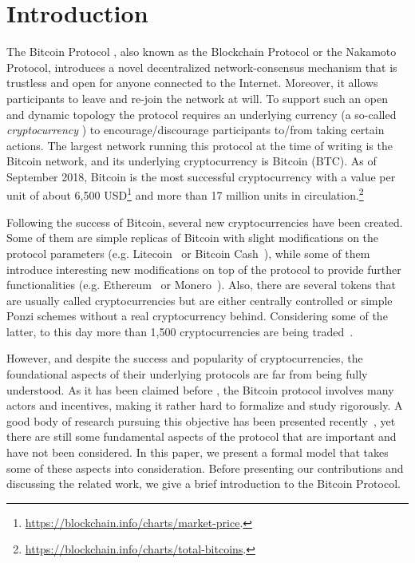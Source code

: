 
\section{Introduction}

The Bitcoin Protocol \cite{Bitcoin,DBLP:books/daglib/0040621,NC17}, also known as the Blockchain Protocol or the Nakamoto Protocol, introduces a novel decentralized network-consensus mechanism that is trustless 
and open for anyone connected to the Internet. Moreover, it allows participants to leave and re-join the network at will. To support such an open and dynamic topology the protocol requires an underlying currency (a so-called \emph{cryptocurrency} \cite{NC17}) to encourage/discourage participants to/from taking certain actions. The largest network running this protocol at the time of writing is the Bitcoin network, and its underlying cryptocurrency is Bitcoin (BTC). As of September 2018, Bitcoin is the most successful cryptocurrency with a value per unit of about 6,500 USD\footnote{\url{https://blockchain.info/charts/market-price}.}
and more than 17 million units in circulation.\footnote{\url{https://blockchain.info/charts/total-bitcoins}.}
 
Following the success of Bitcoin, several new cryptocurrencies have been created. Some of them are simple replicas of Bitcoin with slight modifications on the protocol parameters (e.g. Litecoin~\cite{Litecoin} or Bitcoin Cash~\cite{Bcash}), while some of them introduce interesting new modifications on top of the protocol to provide further functionalities (e.g. Ethereum~\cite{Ethereum,E17} or Monero~\cite{Monero}). Also, there are several tokens that are usually called cryptocurrencies but are either centrally controlled or simple Ponzi schemes without a real cryptocurrency behind.
Considering some of the latter, to this day more than 1,500 cryptocurrencies are being traded~\cite{coinmarketcap}.

However, and despite the success and popularity of cryptocurrencies, the foundational aspects of their underlying protocols are far from being fully understood. As it has been claimed before \cite{mininggames:2016}, the Bitcoin protocol involves many actors and incentives, making it rather hard to formalize and study rigorously. A good body of research pursuing this objective has been presented recently~\cite{mininggames:2016,optimalselfishmining2017,instabilitywithoutreward:2016,selfishmining2014,stop_selfish_mining2014,eclipseattacks2015,LBSZR15,LJG15,stubborn_mining:2016,economics_of_mining2013,ZGR17,ABLZ17,MHG18,SZWTK18}, 
yet there are still some fundamental aspects of the protocol that are important and have not been considered. 
In this paper, we present a formal model that takes some of these aspects into consideration. Before presenting our contributions and discussing the related work, we give a brief introduction to the Bitcoin Protocol.

